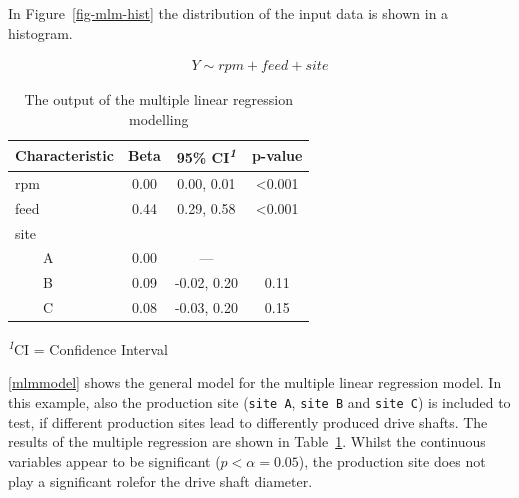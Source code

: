 \documentclass[
  a4paper,
]{scrbook}
\begin{document}
In Figure~\ref{fig-mlm-hist} the distribution of the input data is shown
in a histogram.

\begin{align}
Y \sim rpm + feed+ site \label{mlmmodel}
\end{align}

\begingroup
\fontsize{12.0pt}{14.4pt}\selectfont
\setlength{\LTpost}{0mm}

\begin{longtable}{lccc}

\caption{\label{tbl-mlm-mdl}The output of the multiple linear regression
modelling}

\tabularnewline

\toprule
\textbf{Characteristic} & \textbf{Beta} & \textbf{95\% CI}\textsuperscript{\textit{1}} & \textbf{p-value} \\ 
\midrule\addlinespace[2.5pt]
rpm & 0.00 & 0.00, 0.01 & <0.001 \\ 
feed & 0.44 & 0.29, 0.58 & <0.001 \\ 
site &  &  &  \\ 
    A & 0.00 & — &  \\ 
    B & 0.09 & -0.02, 0.20 & 0.11 \\ 
    C & 0.08 & -0.03, 0.20 & 0.15 \\ 
\bottomrule

\end{longtable}

\begin{minipage}{\linewidth}
\textsuperscript{\textit{1}}CI = Confidence Interval\\
\end{minipage}
\endgroup

\eqref{mlmmodel} shows the general model for the multiple linear
regression model. In this example, also the production site
(\texttt{site\ A}, \texttt{site\ B} and \texttt{site\ C}) is included to
test, if different production sites lead to differently produced drive
shafts. The results of the multiple regression are shown in
Table~\ref{tbl-mlm-mdl}. Whilst the continuous variables appear to be
significant (\(p<\alpha = 0.05\)), the production site does not play a
significant rolefor the drive shaft diameter.
\end{document}
